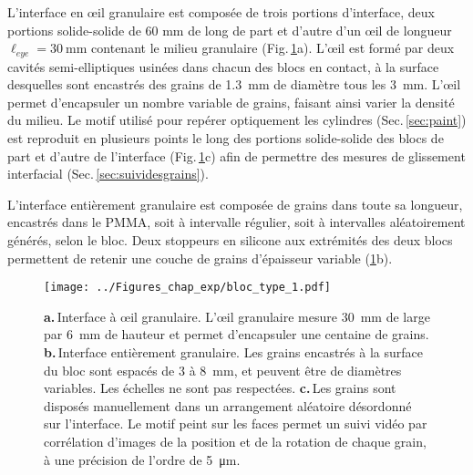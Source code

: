 
L'interface en œil granulaire est composée de trois portions d'interface, deux portions solide-solide de 60 mm de long de part et d'autre d'un œil de longueur $\ell_{eye} = \SI{30}{\mm}$ contenant le milieu granulaire (Fig.\,\ref{fig:blocgran}a). L'œil est formé par deux cavités semi-elliptiques usinées dans chacun des blocs en contact, à la surface desquelles sont encastrés des grains de \SI{1.3}{\milli\meter} de diamètre tous les \SI{3}{\mm}. L'œil permet d'encapsuler un nombre variable de grains, faisant ainsi varier la densité du milieu. Le motif utilisé pour repérer optiquement les cylindres (Sec.\,\ref{sec:paint}) est reproduit en plusieurs points le long des portions solide-solide des blocs de part et d'autre de l'interface (Fig.\,\ref{fig:blocgran}c) afin de permettre des mesures de glissement interfacial (Sec.\,\ref{sec:suividesgrains}).


\pagebreak




L'interface entièrement granulaire est composée de grains dans toute sa longueur, encastrés dans le PMMA, soit à intervalle régulier, soit à intervalles aléatoirement générés, selon le bloc. Deux stoppeurs en silicone aux extrémités des deux blocs permettent de retenir une couche de grains d'épaisseur variable (\ref{fig:blocgran}b).




\begin{figure}[htb]
\centering	
\texttt{[image: ../Figures\_chap\_exp/bloc\_type\_1.pdf]}
\caption[Schéma des interfaces granulaires]{\textbf{a.}\,Interface à œil granulaire. L'œil granulaire mesure \SI{30}{\mm} de large par \SI{6}{\milli\meter} de hauteur et permet d'encapsuler une centaine de grains. \textbf{b.}\,Interface entièrement granulaire. Les grains encastrés à la surface du bloc sont espacés de 3 à \SI{8}{\milli\meter}, et peuvent être de diamètres variables. Les échelles ne sont pas respectées. \textbf{c.}\,Les grains sont disposés manuellement dans un arrangement aléatoire désordonné sur l'interface. Le motif peint sur les faces permet un suivi vidéo par corrélation d'images de la position et de la rotation de chaque grain, à une précision de l'ordre de \SI{5}{\micro\meter}.}
\label{fig:blocgran}
\end{figure}




